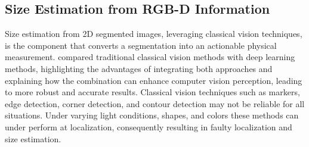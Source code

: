 \begin{table}[htbp]
\centering
\caption{Semantic segmentation architecture families relevant to industrial component handling.}
\label{tab:lit_seg}
\end{table}

\subsection{Size Estimation from RGB-D Information}\label{subsec:lit_size}

Size estimation from 2D segmented images, leveraging classical vision techniques, is the component
that converts a segmentation into an actionable physical measurement. \citet{omahony2020deep} compared traditional classical vision methods with deep learning methods, highlighting the advantages of integrating both approaches and explaining how the combination can
enhance computer vision perception, leading to more robust and accurate results. Classical vision
techniques such as markers, edge detection, corner detection, and contour detection may not be
reliable for all situations. Under varying light conditions, shapes, and colors these methods can
under perform at localization, consequently resulting in faulty localization and size
estimation.


